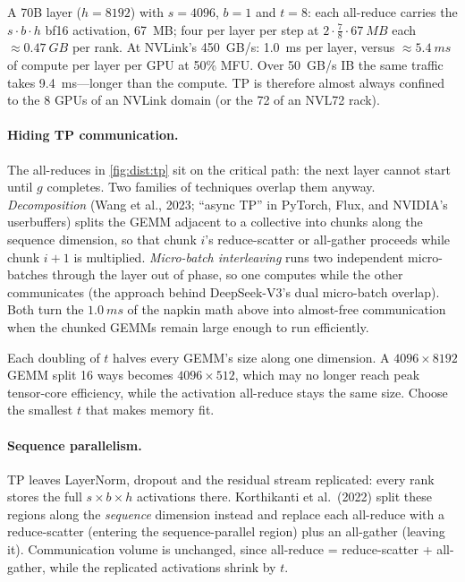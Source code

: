 \begin{napkinmath}
A 70B layer ($h=8192$) with $s=4096$, $b=1$ and $t=8$: each all-reduce carries the
$s\cdot b\cdot h$ bf16 activation, \SI{67}{MB}; four per layer per step at
$2\cdot\frac78\cdot\SI{67}{MB}$ each $\approx\SI{0.47}{GB}$ per rank. At NVLink's
\SI{450}{GB/s}: \SI{1.0}{ms} per layer, versus $\approx\SI{5.4}{ms}$ of compute per layer per
GPU at 50\% MFU. Over \SI{50}{GB/s} IB the same traffic takes \SI{9.4}{ms}---longer than the
compute. TP is therefore almost always confined to the 8 GPUs of an NVLink domain (or the 72
of an NVL72 rack).
\end{napkinmath}

\paragraph{Hiding TP communication.} The all-reduces in \cref{fig:dist:tp} sit on the
critical path: the next layer cannot start until $g$ completes. Two families of techniques
overlap them anyway. \emph{Decomposition} (Wang et al., 2023; ``async TP'' in PyTorch, Flux,
and NVIDIA's userbuffers) splits the GEMM adjacent to a collective into chunks along the
sequence dimension, so that chunk $i$'s reduce-scatter or all-gather proceeds while chunk $i+1$
is multiplied. \emph{Micro-batch interleaving} runs two independent micro-batches through the
layer out of phase, so one computes while the other communicates (the approach behind
DeepSeek-V3's dual micro-batch overlap). Both turn the $\SI{1.0}{ms}$ of the napkin math
above into almost-free communication when the chunked GEMMs remain large enough to run
efficiently.

\begin{keyidea}
Each doubling of $t$ halves every GEMM's size along one dimension. A $4096\times8192$ GEMM split
16 ways becomes $4096\times512$, which may no longer reach peak tensor-core efficiency, while the
activation all-reduce stays the same size. Choose the smallest $t$ that makes memory fit.
\end{keyidea}

\paragraph{Sequence parallelism.} TP leaves LayerNorm, dropout and the residual stream
replicated: every rank stores the full $s\times b\times h$ activations there. Korthikanti et al.\
(2022) split these regions along the \emph{sequence} dimension instead and replace each
all-reduce with a reduce-scatter (entering the sequence-parallel region) plus an all-gather
(leaving it). Communication volume is unchanged, since all-reduce = reduce-scatter +
all-gather, while the replicated activations shrink by $t$.

